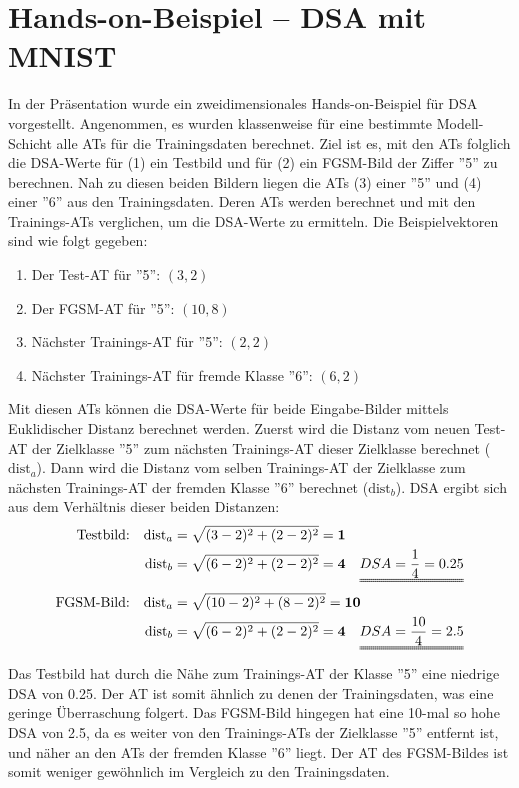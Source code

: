 \documentclass[sigconf, natbib=false]{acmart}
\begin{document}
\section{Hands-on-Beispiel -- DSA mit MNIST} \label{sec:hands_on}
In der Präsentation wurde ein zweidimensionales Hands-on-Beispiel für DSA vorgestellt. Angenommen, es wurden klassenweise für eine bestimmte Modell-Schicht alle ATs für die Trainingsdaten berechnet. Ziel ist es, mit den ATs folglich die DSA-Werte für (1) ein Testbild und für (2) ein FGSM-Bild der Ziffer ''5'' zu berechnen. Nah zu diesen beiden Bildern liegen die ATs (3) einer ''5'' und (4) einer ''6'' aus den Trainingsdaten. Deren ATs werden berechnet und mit den Trainings-ATs verglichen, um die DSA-Werte zu ermitteln. Die Beispielvektoren sind wie folgt gegeben:
\begin{enumerate}
    \item Der Test-AT für ''5'': $(3,2)$
    \item Der FGSM-AT für ''5'': $(10,8)$
    \item Nächster Trainings-AT für ''5'': $(2,2)$
    \item Nächster Trainings-AT für fremde Klasse ''6'': $(6,2)$
\end{enumerate}
Mit diesen ATs können die DSA-Werte für beide Eingabe-Bilder mittels Euklidischer Distanz berechnet werden. Zuerst wird die Distanz vom neuen Test-AT der Zielklasse ''5'' zum nächsten Trainings-AT dieser Zielklasse berechnet ($\text{dist}_a$). Dann wird die Distanz vom selben Trainings-AT der Zielklasse zum nächsten Trainings-AT der fremden Klasse ''6'' berechnet ($\text{dist}_b$). DSA ergibt sich aus dem Verhältnis dieser beiden Distanzen:
\begin{align*}
\text{Testbild:} \quad \text{dist}_a &= \sqrt{(3-2)^2+(2-2)^2} = \textbf{1} \\
\text{dist}_b &= \sqrt{(6-2)^2+(2-2)^2} = \textbf{4} \quad \uuline{DSA = \frac{1}{4} = 0.25} \\
\text{FGSM-Bild:} \quad \text{dist}_a &= \sqrt{(10-2)^2+(8-2)^2} = \textbf{10} \\
\text{dist}_b &= \sqrt{(6-2)^2+(2-2)^2} = \textbf{4} \quad \uuline{DSA = \frac{10}{4} = 2.5}
\end{align*}
Das Testbild hat durch die Nähe zum Trainings-AT der Klasse ''5'' eine niedrige DSA von 0.25. Der AT ist somit ähnlich zu denen der Trainingsdaten, was eine geringe Überraschung folgert. Das FGSM-Bild hingegen hat eine 10-mal so hohe DSA von 2.5, da es weiter von den Trainings-ATs der Zielklasse ''5'' entfernt ist, und näher an den ATs der fremden Klasse ''6'' liegt. Der AT des FGSM-Bildes ist somit weniger gewöhnlich im Vergleich zu den Trainingsdaten.
\end{document}
